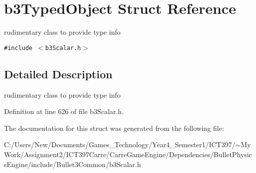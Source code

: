 \hypertarget{structb3_typed_object}{
\section{b3TypedObject Struct Reference}
\label{structb3_typed_object}
}
rudimentary class to provide type info  


{\tt \#include $<$b3Scalar.h$>$}



\subsection{Detailed Description}
rudimentary class to provide type info 

Definition at line 626 of file b3Scalar.h.

The documentation for this struct was generated from the following file:\begin{CompactItemize}
\item 
C:/Users/New/Documents/Games\_\-Technology/Year4\_\-Semester1/ICT397/$\sim$My Work/Assignment2/ICT397Carre/CarreGameEngine/Dependencies/BulletPhysicsEngine/include/Bullet3Common/b3Scalar.h\end{CompactItemize}
